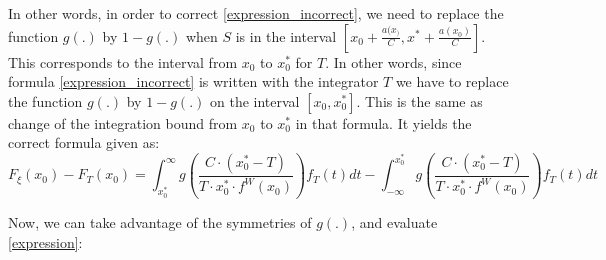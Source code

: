 \documentclass[12pt]{amsart}
\theoremstyle{definition}
\numberwithin{equation}{section}
\numberwithin{equation}{section}
\theoremstyle{remark}
\numberwithin{equation}{section}
\begin{document}
In other words, in order to correct \ref{expression_incorrect}, we need to replace the function $g(.)$ by $1-g(.)$ when $S$ is in the interval $[x_0+\frac{a(x_)}{C},x^*+\frac{a(x_0)}{C}]$.
This corresponds to the interval from $x_0$ to $x^*_0$ for $T$. In other words, since formula \ref{expression_incorrect} is written with the integrator $T$ we have to replace the
 function $g(.)$ by $1-g(.)$ on the interval $[x_0,x_0^*]$. This is the same as change of the integration bound from $x_0$ to $x_0^*$ in that formula. It yields the correct formula given as:
 \begin{equation}
 \label{expression}
 F_\xi(x_0)-F_T(x_0)=\int_{x_0^*}^\infty   g\left(\frac{C\cdot (x_0^*-T)}{T\cdot x_0^*\cdot f^W(x_0)}\right )
 f_T(t)dt-\int_{-\infty}^{x_0^*}    g\left(\frac{C\cdot (x_0^*-T)}{T\cdot x_0^*\cdot f^W(x_0)}\right)f_T(t)dt
 \end{equation}


Now, we can take advantage of the symmetries of $g(.)$, and evaluate \ref{expression}:
\end{document}
